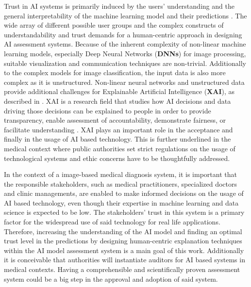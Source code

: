 \documentclass[11pt,a4paper,english]{scrreprt}
\begin{document}
Trust in AI systems is primarily induced by the users' understanding and the general interpretability of the machine learning model and their predictions \parencite{ribeiro_why_2016, ras_explanation_2018}. The wide array of different possible user groups and the complex constructs of understandability and trust demands for a human-centric approach in designing AI assessment systems. Because of the inherent complexity of non-linear machine learning models, especially Deep Neural Networks (\textbf{DNNs}) for image processing, suitable visualization and communication techniques are non-trivial. Additionally to the complex models for image classification, the input data is also more complex as it is unstructured. Non-linear neural networks and unstructured data provide additional challenges for Explainable Artificial Intelligence (\textbf{XAI}), as described in \textcite{keane_how_2019}. XAI is a research field that studies how AI decisions and data driving those decisions can be explained to people in order to provide transparency, enable assessment of accountability, demonstrate fairness, or facilitate understanding \parencite{arrieta_explainable_2019}. XAI plays an important role in the acceptance and finally in the usage of AI based technology. This is further underlined in the medical context where public authorities set strict regulations on the usage of technological systems and ethic concerns have to be thoughtfully addressed.

In the context of a image-based medical diagnosis system, it is important that the responsible stakeholders, such as medical practitioners, specialized doctors and clinic managements, are enabled to make informed decisions on the usage of AI based technology, even though their expertise in machine learning and data science is expected to be low. The stakeholders' trust in this system is a primary factor for the widespread use of said technology for real life applications. Therefore, increasing the understanding of the AI model and finding an optimal trust level in the predictions by designing human-centric explanation techniques within the AI model assessment system is a main goal of this work. Additionally it is conceivable that authorities will instantiate auditors for AI based systems in medical contexts. Having a comprehensible and scientifically proven assessment system could be a big step in the approval and adoption of said system. 
\end{document}
